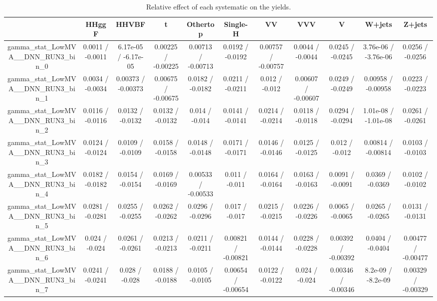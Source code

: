 \documentclass[10pt]{article}
\begin{document}
\begin{table}[htbp]
\begin{center}
\begin{tabular}{|c|c|c|c|c|c|c|c|c|c|c|}
\hline 
      & HHggF      & HHVBF      & t      & Othertop      & Single-H      & VV      & VVV      & V      & W+jets      & Z+jets \\ 
\hline 
  gamma_stat_LowMVA__DNN_RUN3_bin_0 & 0.0011 / -0.0011 & 6.17e-05 / -6.17e-05 & 0.00225 / -0.00225 & 0.00713 / -0.00713 & 0.0192 / -0.0192 & 0.00757 / -0.00757 & 0.0044 / -0.0044 & 0.0245 / -0.0245 & 3.76e-06 / -3.76e-06 & 0.0256 / -0.0256 \\ 
  gamma_stat_LowMVA__DNN_RUN3_bin_1 & 0.0034 / -0.0034 & 0.00373 / -0.00373 & 0.00675 / -0.00675 & 0.0182 / -0.0182 & 0.0211 / -0.0211 & 0.012 / -0.012 & 0.00607 / -0.00607 & 0.0249 / -0.0249 & 0.00958 / -0.00958 & 0.0223 / -0.0223 \\ 
  gamma_stat_LowMVA__DNN_RUN3_bin_2 & 0.0116 / -0.0116 & 0.0132 / -0.0132 & 0.0132 / -0.0132 & 0.014 / -0.014 & 0.0141 / -0.0141 & 0.0214 / -0.0214 & 0.0118 / -0.0118 & 0.0294 / -0.0294 & 1.01e-08 / -1.01e-08 & 0.0261 / -0.0261 \\ 
  gamma_stat_LowMVA__DNN_RUN3_bin_3 & 0.0124 / -0.0124 & 0.0109 / -0.0109 & 0.0158 / -0.0158 & 0.0148 / -0.0148 & 0.0171 / -0.0171 & 0.0146 / -0.0146 & 0.0125 / -0.0125 & 0.012 / -0.012 & 0.00814 / -0.00814 & 0.0103 / -0.0103 \\ 
  gamma_stat_LowMVA__DNN_RUN3_bin_4 & 0.0182 / -0.0182 & 0.0154 / -0.0154 & 0.0169 / -0.0169 & 0.00533 / -0.00533 & 0.011 / -0.011 & 0.0164 / -0.0164 & 0.0163 / -0.0163 & 0.0091 / -0.0091 & 0.0369 / -0.0369 & 0.0102 / -0.0102 \\ 
  gamma_stat_LowMVA__DNN_RUN3_bin_5 & 0.0281 / -0.0281 & 0.0255 / -0.0255 & 0.0262 / -0.0262 & 0.0296 / -0.0296 & 0.017 / -0.017 & 0.0215 / -0.0215 & 0.0226 / -0.0226 & 0.0065 / -0.0065 & 0.0265 / -0.0265 & 0.0131 / -0.0131 \\ 
  gamma_stat_LowMVA__DNN_RUN3_bin_6 & 0.024 / -0.024 & 0.0261 / -0.0261 & 0.0213 / -0.0213 & 0.0211 / -0.0211 & 0.00821 / -0.00821 & 0.0144 / -0.0144 & 0.0228 / -0.0228 & 0.00392 / -0.00392 & 0.0404 / -0.0404 & 0.00477 / -0.00477 \\ 
  gamma_stat_LowMVA__DNN_RUN3_bin_7 & 0.0241 / -0.0241 & 0.028 / -0.028 & 0.0188 / -0.0188 & 0.0105 / -0.0105 & 0.00654 / -0.00654 & 0.0122 / -0.0122 & 0.024 / -0.024 & 0.00346 / -0.00346 & 8.2e-09 / -8.2e-09 & 0.00329 / -0.00329 \\ 
\hline 
\end{tabular} 
\caption{Relative effect of each systematic on the yields.} 
\end{center} 
\end{table} 
\end{document}
